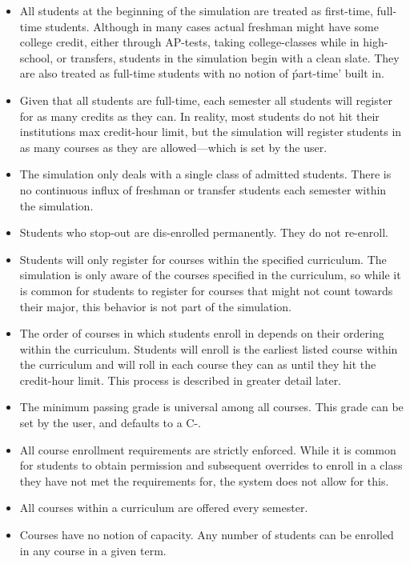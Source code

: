 \documentclass[botnum, fleqn]{unmeethesis}
\begin{document}
    \begin{itemize}
      \item All students at the beginning of the simulation are treated as first-time, full-time students. Although in many cases actual freshman might have some college credit, either through AP-tests, taking college-classes while in high-school, or transfers, students in the simulation begin with a clean slate. They are also treated as full-time students with no notion of \'part-time' built in.
      \item Given that all students are full-time, each semester all students will register for as many credits as they can. In reality, most students do not hit their institutions max credit-hour limit, but the simulation will register students in as many courses as they are allowed---which is set by the user.
      \item The simulation only deals with a single class of admitted students. There is no continuous influx of freshman or transfer students each semester within the simulation.
      \item Students who stop-out are dis-enrolled permanently. They do not re-enroll.
      \item Students will only register for courses within the specified curriculum. The simulation is only aware of the courses specified in the curriculum, so while it is common for students to register for courses that might not count towards their major, this behavior is not part of the simulation.
      \item The order of courses in which students enroll in depends on their ordering within the curriculum. Students will enroll is the earliest listed course within the curriculum and will roll in each course they can as until they hit the credit-hour limit. This process is described in greater detail later.
      \item The minimum passing grade is universal among all courses. This grade can be set by the user, and defaults to a C-.
      \item All course enrollment requirements are strictly enforced. While it is common for students to obtain permission and subsequent overrides to enroll in a class they have not met the requirements for, the system does not allow for this.
      \item All courses within a curriculum are offered every semester.
      \item Courses have no notion of capacity. Any number of students can be enrolled in any course in a given term.
    \end{itemize}
\end{document}
